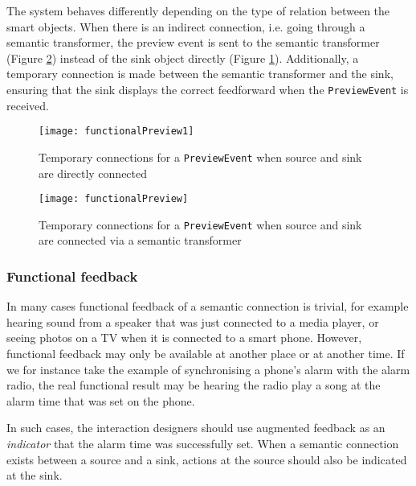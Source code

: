 The system behaves differently depending on the type of relation between the smart objects. When there is an indirect connection, i.e. going through a semantic transformer, the preview event is sent to the semantic transformer (Figure \ref{functionalPreview}) instead of the sink object directly (Figure \ref{functionalPreview1}). Additionally, a temporary connection is made between the semantic transformer and the sink, ensuring that the sink displays the correct feedforward when the \texttt{PreviewEvent} is received.


\begin{figure}
\centering
\texttt{[image: functionalPreview1]}
\caption{Temporary connections for a \texttt{PreviewEvent} when source and sink are directly connected}
\label{functionalPreview1}
\end{figure}

\begin{figure}
\centering
\texttt{[image: functionalPreview]}
\caption{Temporary connections for a \texttt{PreviewEvent} when source and sink are connected via a semantic transformer}
\label{functionalPreview}
\end{figure}

\subsubsection{Functional feedback}
In many cases functional feedback of a semantic connection is trivial, for example hearing sound from a speaker that was just connected to a media player, or seeing photos on a TV when it is connected to a smart phone. However, functional feedback may only be available at another place or at another time. If we for instance take the example of synchronising a phone's alarm with the alarm radio, the real functional result may be hearing the radio play a song at the alarm time that was set on the phone. 

In such cases, the interaction designers should use augmented feedback as an \emph{indicator} that the alarm time was successfully set. When a semantic connection exists between a source and a sink, actions at the source should also be indicated at the sink. 


